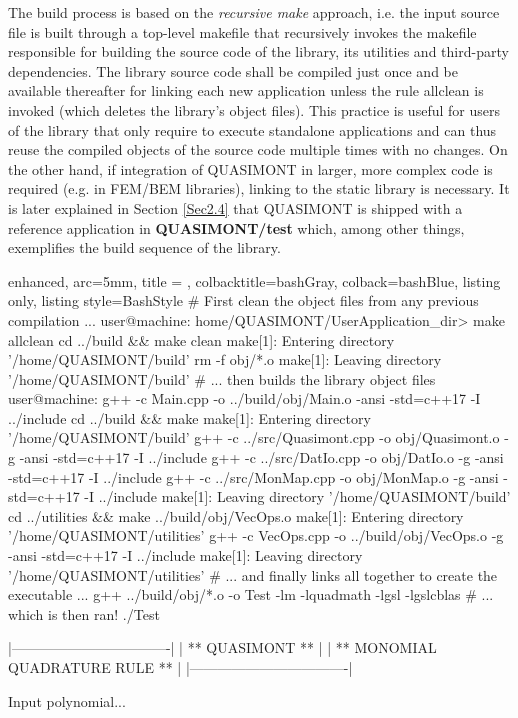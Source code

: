 \documentclass[a4paper, twosided]{book}
\begin{document}
\noindent
The build process is based on the \textsl{recursive make} approach, i.e. the input source file is built through a top-level \colorbox{poliGrayBlue}{makefile} that recursively invokes the \colorbox{poliGrayBlue}{makefile} responsible for building the source code of the library, its utilities and third-party dependencies. The library source code shall be compiled just once and be available thereafter for linking each new application unless the rule \colorbox{poliGrayBlue}{allclean} is invoked (which deletes the library's object files). This practice is useful for users of the library that only require to execute standalone applications and can thus reuse the compiled objects of the source code multiple times with no changes. On the other hand, if integration of QUASIMONT in larger, more complex code is required (e.g. in FEM/BEM libraries), linking to the static library is necessary. It is later explained in Section \ref{Sec2.4} that QUASIMONT is shipped with a reference application in \colorbox{poliGrayBlue}{\textbf{QUASIMONT/test}}  which, among other things, exemplifies the build sequence of the library. 

\vspace{0.5cm}
\begin{tcblisting}{enhanced,
                   arc=5mm,
                   title = \color{black}{\large \ttfamily Compilation and Linking of the library},
                   colbacktitle=bashGray,
                   colback=bashBlue,
                   listing only,
                   listing style=BashStyle}
# First clean the object files from any previous compilation ...
user@machine: home/QUASIMONT/UserApplication_dir> make allclean
cd ../build && make clean
make[1]: Entering directory '/home/QUASIMONT/build'
rm -f obj/*.o
make[1]: Leaving directory '/home/QUASIMONT/build'
# ... then builds the library object files
user@machine: g++ -c Main.cpp -o ../build/obj/Main.o -ansi -std=c++17 -I ../include
cd ../build && make
make[1]: Entering directory '/home/QUASIMONT/build'
g++ -c ../src/Quasimont.cpp -o obj/Quasimont.o -g -ansi -std=c++17 -I ../include 
g++ -c ../src/DatIo.cpp -o obj/DatIo.o -g -ansi -std=c++17 -I ../include 
g++ -c ../src/MonMap.cpp -o obj/MonMap.o -g -ansi -std=c++17 -I ../include 
make[1]: Leaving directory '/home/QUASIMONT/build'
cd ../utilities && make ../build/obj/VecOps.o
make[1]: Entering directory '/home/QUASIMONT/utilities'
g++ -c VecOps.cpp -o ../build/obj/VecOps.o -g -ansi -std=c++17 -I ../include 
make[1]: Leaving directory '/home/QUASIMONT/utilities'
# ... and finally links all together to create the executable ...
g++ ../build/obj/*.o -o Test -lm -lquadmath -lgsl -lgslcblas
# ... which is then ran!
./Test

    |----------------------------------|
    |          ** QUASIMONT **         |
    |  ** MONOMIAL QUADRATURE RULE **  |
    |----------------------------------|


 Input polynomial...
\end{tcblisting}
\vspace{0.5cm}
\end{document}
